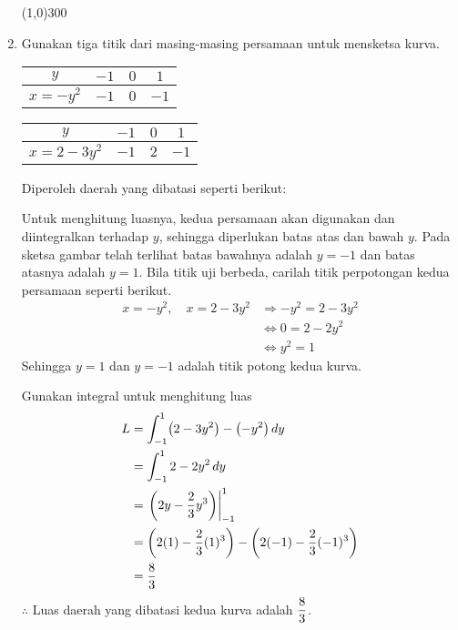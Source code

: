 \begin{enumerate}[leftmargin=*, label={\arabic*}.]
\begin{enumerate}[label={\alph*}.]
    \end{enumerate}

\begin{center}\line(1,0){300}\end{center}


\item Gunakan tiga titik dari masing-masing persamaan untuk mensketsa kurva.
\begin{center}
    \begin{tabular}{|c|c|c|c|}\hline
        $y$ & $-1$ & $0$ & $1$ \\ \hline
        $x=-y^2$ & $-1$ & $0$ & $-1$ \\ \hline
    \end{tabular}\quad
    \begin{tabular}{|c|c|c|c|}\hline
        $y$ & $-1$ & $0$ & $1$ \\ \hline
        $x=2-3y^{2}$ & $-1$ & $2$ & $-1$ \\ \hline
    \end{tabular}
\end{center}
Diperoleh daerah yang dibatasi seperti berikut:



Untuk menghitung luasnya, kedua persamaan akan digunakan dan diintegralkan terhadap $y$, sehingga 
diperlukan batas atas dan bawah $y$. Pada sketsa gambar telah terlihat batas bawahnya adalah $y=-1$ dan 
batas atasnya adalah $y=1$. Bila titik uji berbeda, carilah titik perpotongan kedua persamaan seperti berikut.
\begin{align*}
    x = -y^{2},\quad x = 2-3y^{2} &\Longrightarrow -y^{2}= 2-3y^{2}\\
    &\iff 0 = 2-2y^{2}\\
    &\iff y^{2} = 1
\end{align*}
Sehingga $y = 1$ dan $y=-1$ adalah titik potong kedua kurva.

Gunakan integral untuk menghitung luas
\begin{align*}
    L &= \int_{-1}^{1} \brk*{2-3y^{2}}-\brk*{-y^{2}}\,dy\\
    &=\int_{-1}^{1} 2-2y^{2}\,dy\\
    &=\eval{2y-\frac{2}{3}y^{3}}{-1}{1}\\
    &=\brk*{2(1)-\frac{2}{3}(1)^{3}}-\brk*{2(-1)-\frac{2}{3}(-1)^{3}}\\
    &=\frac{8}{3}
\end{align*}
$\therefore$ Luas daerah yang dibatasi kedua kurva adalah $\displaystyle\frac{8}{3}$.



\end{enumerate}
